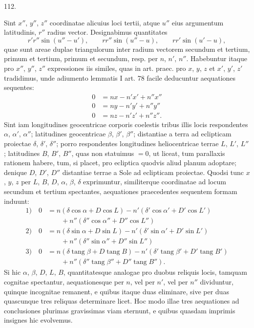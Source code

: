 \par{}\medskip
{}
\begin{center}112.\end{center}
Sint $x''$, $y''$, $z''$ coordinatae alicuius loci tertii, atque $u''$ eius argumentum latitudinis, $r''$ radius vector. Designabimus quantitates
\[
r'r''\sin(u''-u'),\qquad rr''\sin(u''-u),\qquad rr'\sin(u'-u),
\]
quae sunt areae duplae triangulorum inter radium vectorem secundum et tertium, primum et tertium, primum et secundum, resp. per $n$, $n'$, $n''$. Habebuntur itaque pro $x''$, $y''$, $z''$ expressiones iis similes, quas in art. praec. pro $x$, $y$, $z$ et $x'$, $y'$, $z'$ tradidimus, unde adiumento lemmatis I art. 78 facile deducuntur aequationes sequentes:
\[
\begin{aligned}
0&=nx-n'x'+n''x''\\
0&=ny-n'y'+n''y''\\
0&=nz-n'z'+n''z''.
\end{aligned}
\]
Sint iam longitudines geocentricae corporis coelestis tribus illis locis respondentes $\alpha$, $\alpha'$, $\alpha''$; latitudines geocentricae $\beta$, $\beta'$, $\beta''$; distantiae a terra ad eclipticam proiectae $\delta$, $\delta'$, $\delta''$; porro respondentes longitudines heliocentricae terrae $L$, $L'$, $L''$; latitudines $B$, $B'$, $B''$, quas non statuimus $=0$, ut liceat, tum parallaxis rationem habere, tum, si placet, pro ecliptica quodvis aliud planum adoptare; denique $D$, $D'$, $D''$ distantiae terrae a Sole ad eclipticam proiectae. Quodsi tunc $x$, $y$, $z$ per $L$, $B$, $D$, $\alpha$, $\beta$, $\delta$ exprimuntur, similiterque coordinatae ad locum secundum et tertium spectantes, aequationes praecedentes sequentem formam induunt:
\[
\begin{aligned}
1)\quad 0&=n(\delta\cos\alpha+D\cos L)-n'(\delta'\cos\alpha'+D'\cos L')\\
&\qquad+n''(\delta''\cos\alpha''+D''\cos L'')\\[.5ex]
2)\quad 0&=n(\delta\sin\alpha+D\sin L)-n'(\delta'\sin\alpha'+D'\sin L')\\
&\qquad+n''(\delta''\sin\alpha''+D''\sin L'')\\[.5ex]
3)\quad 0&=n(\delta\operatorname{tang}\beta+D\operatorname{tang}B)-n'(\delta'\operatorname{tang}\beta'+D'\operatorname{tang}B')\\
&\qquad+n''(\delta''\operatorname{tang}\beta''+D''\operatorname{tang}B'').
\end{aligned}
\]
Si hic $\alpha$, $\beta$, $D$, $L$, $B$, quantitatesque analogae pro duobus reliquis locis, tamquam cognitae spectantur, aequationesque per $n$, vel per $n'$, vel per $n''$ dividuntur, quinque incognitae remanent, e quibus itaque duas eliminare, sive per duas quascunque tres reliquas determinare licet. Hoc modo illae tres aequationes ad conclusiones plurimas gravissimas viam sternunt, e quibus quasdam imprimis insignes hic evolvemus.
